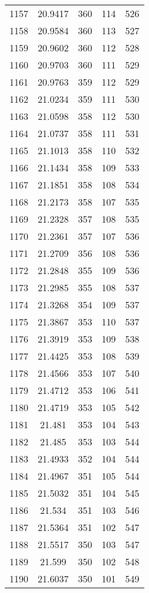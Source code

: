 \documentclass[12pt,a4paper]{article}
\begin{document}
\begin{tabular}{r|cccc}
	1157 & 20.9417 & 360 & 114 & 526 \\
	1158 & 20.9584 & 360 & 113 & 527 \\
	1159 & 20.9602 & 360 & 112 & 528 \\
	1160 & 20.9703 & 360 & 111 & 529 \\
	1161 & 20.9763 & 359 & 112 & 529 \\
	1162 & 21.0234 & 359 & 111 & 530 \\
	1163 & 21.0598 & 358 & 112 & 530 \\
	1164 & 21.0737 & 358 & 111 & 531 \\
	1165 & 21.1013 & 358 & 110 & 532 \\
	1166 & 21.1434 & 358 & 109 & 533 \\
	1167 & 21.1851 & 358 & 108 & 534 \\
	1168 & 21.2173 & 358 & 107 & 535 \\
	1169 & 21.2328 & 357 & 108 & 535 \\
	1170 & 21.2361 & 357 & 107 & 536 \\
	1171 & 21.2709 & 356 & 108 & 536 \\
	1172 & 21.2848 & 355 & 109 & 536 \\
	1173 & 21.2985 & 355 & 108 & 537 \\
	1174 & 21.3268 & 354 & 109 & 537 \\
	1175 & 21.3867 & 353 & 110 & 537 \\
	1176 & 21.3919 & 353 & 109 & 538 \\
	1177 & 21.4425 & 353 & 108 & 539 \\
	1178 & 21.4566 & 353 & 107 & 540 \\
	1179 & 21.4712 & 353 & 106 & 541 \\
	1180 & 21.4719 & 353 & 105 & 542 \\
	1181 & 21.481 & 353 & 104 & 543 \\
	1182 & 21.485 & 353 & 103 & 544 \\
	1183 & 21.4933 & 352 & 104 & 544 \\
	1184 & 21.4967 & 351 & 105 & 544 \\
	1185 & 21.5032 & 351 & 104 & 545 \\
	1186 & 21.534 & 351 & 103 & 546 \\
	1187 & 21.5364 & 351 & 102 & 547 \\
	1188 & 21.5517 & 350 & 103 & 547 \\
	1189 & 21.599 & 350 & 102 & 548 \\
	1190 & 21.6037 & 350 & 101 & 549 \\

\end{tabular}
\end{document}
